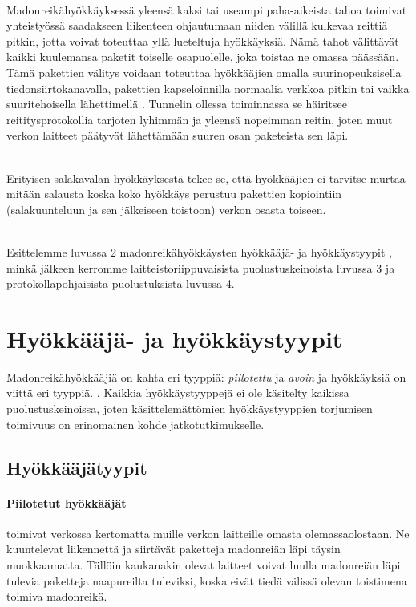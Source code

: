 \documentclass[finnish]{tktltiki2}
\theoremstyle{definition}
\theoremstyle{remark}
\begin{document}
\noindent \\
Madonreikähyökkäyksessä yleensä kaksi tai useampi paha-aikeista tahoa toimivat yhteistyössä saadakseen liikenteen ohjautumaan niiden välillä kulkevaa reittiä pitkin, jotta voivat toteuttaa yllä lueteltuja hyökkäyksiä. Nämä tahot välittävät kaikki kuulemansa paketit toiselle osapuolelle, joka toistaa ne omassa päässään. Tämä pakettien välitys voidaan toteuttaa hyökkääjien omalla suurinopeuksisella tiedonsiirtokanavalla, pakettien kapseloinnilla normaalia verkkoa pitkin tai vaikka suuritehoisella lähettimellä \cite{liteworp}. Tunnelin ollessa toiminnassa se häiritsee reititysprotokollia tarjoten lyhimmän ja yleensä nopeimman reitin, joten muut verkon laitteet päätyvät lähettämään suuren osan paketeista sen läpi. 

\noindent \\
Erityisen salakavalan hyökkäyksestä tekee se, että hyökkääjien ei tarvitse murtaa mitään salausta koska koko hyökkäys perustuu pakettien kopiointiin (salakuunteluun ja sen jälkeiseen toistoon) verkon osasta toiseen.

\noindent \\
Esittelemme luvussa 2 madonreikähyökkäysten hyökkääjä- \cite{delphi} ja hyökkäystyypit \cite{liteworp}, minkä jälkeen kerromme laitteistoriippuvaisista puolustuskeinoista luvussa 3 ja protokollapohjaisista puolustuksista luvussa 4.


\section{Hyökkääjä- ja hyökkäystyypit}

Madonreikähyökkääjiä on kahta eri tyyppiä: \emph{piilotettu} ja \emph{avoin} \cite{delphi} ja hyökkäyksiä on viittä eri tyyppiä. \cite{liteworp}. Kaikkia hyökkäystyyppejä ei ole käsitelty kaikissa puolustuskeinoissa, joten käsittelemättömien hyökkäystyyppien torjumisen toimivuus on erinomainen kohde jatkotutkimukselle.

\subsection{Hyökkääjätyypit}
\paragraph{Piilotetut hyökkääjät} toimivat verkossa kertomatta muille verkon laitteille omasta olemassaolostaan. Ne kuuntelevat liikennettä ja siirtävät paketteja madonreiän läpi täysin muokkaamatta. Tällöin kaukanakin olevat laitteet voivat luulla madonreiän läpi tulevia paketteja naapureilta tuleviksi, koska eivät tiedä välissä olevan toistimena toimiva madonreikä.
\end{document}
